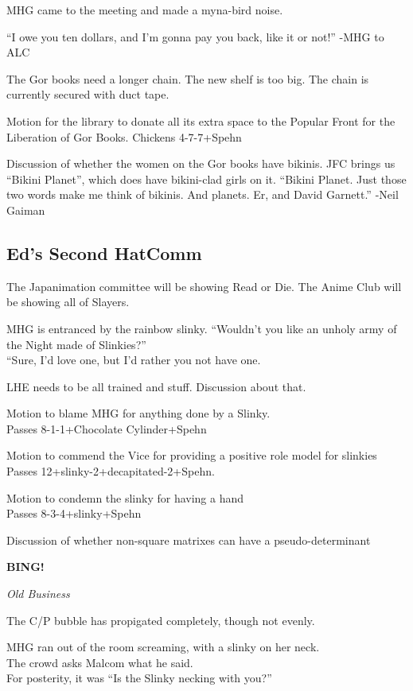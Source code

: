 \documentclass[12pt]{article}
\newcommand{\bing}{{\bf BING!} }
\newcommand{\goto}[1]{\bing \vskip 12pt \centerline{{\em{#1}}}}
\begin{document}
MHG came to the meeting and made a myna-bird noise.

``I owe you ten dollars, and I'm gonna pay you back, like it or not!''
-MHG to ALC

The Gor books need a longer chain. The new shelf is too big. The
chain is currently secured with duct tape.

Motion for the library to donate all its extra space to the Popular
Front for the Liberation of Gor Books.
Chickens 4-7-7+Spehn

Discussion of whether the women on the Gor books have bikinis. JFC
brings us ``Bikini Planet'', which does have bikini-clad girls on it.
``Bikini Planet. Just those two words make me think of bikinis. And
planets. Er, and David Garnett.'' -Neil Gaiman

\subsection*{Ed's Second HatComm}
The Japanimation committee will be showing Read or Die.
The Anime Club will be showing all of Slayers.

MHG is entranced by the rainbow slinky.
``Wouldn't you like an unholy army of the Night made of Slinkies?''\\
``Sure, I'd love one, but I'd rather you not have one.

LHE needs to be all trained and stuff. Discussion about that.

Motion to blame MHG for anything done by a Slinky.\\
Passes 8-1-1+Chocolate Cylinder+Spehn

Motion to commend the Vice for providing a positive role model for
slinkies\\
Passes 12+slinky-2+decapitated-2+Spehn.

Motion to condemn the slinky for having a hand\\
Passes 8-3-4+slinky+Spehn

Discussion of whether non-square matrixes can have a pseudo-determinant

\goto{Old Business}
The C/P bubble has propigated completely, though not evenly.

MHG ran out of the room screaming, with a slinky on her neck.\\
The crowd asks Malcom what he said.\\
For posterity, it was ``Is the Slinky necking with you?''
\end{document}
